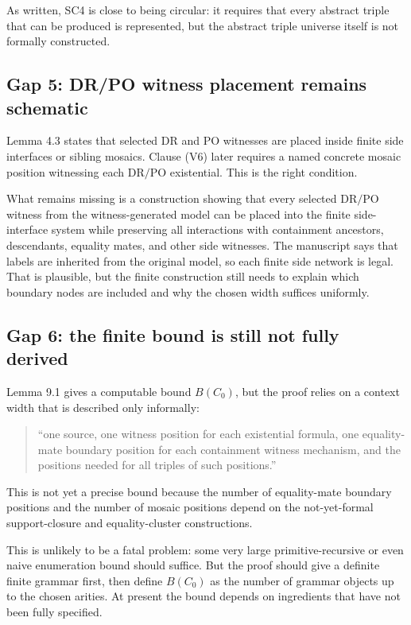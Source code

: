 \documentclass[11pt]{article}
\newcommand{\DR}{\mathrm{DR}}
\newcommand{\PO}{\mathrm{PO}}
\begin{document}
As written, SC4 is close to being circular: it requires that every abstract triple that can be produced is represented, but the abstract triple universe itself is not formally constructed.

\subsection{Gap 5: DR/PO witness placement remains schematic}

Lemma 4.3 states that selected \(\DR\) and \(\PO\) witnesses are placed inside finite side interfaces or sibling mosaics.  Clause (V6) later requires a named concrete mosaic position witnessing each \(\DR/\PO\) existential.  This is the right condition.

What remains missing is a construction showing that every selected \(\DR/\PO\) witness from the witness-generated model can be placed into the finite side-interface system while preserving all interactions with containment ancestors, descendants, equality mates, and other side witnesses.  The manuscript says that labels are inherited from the original model, so each finite side network is legal.  That is plausible, but the finite construction still needs to explain which boundary nodes are included and why the chosen width suffices uniformly.

\subsection{Gap 6: the finite bound is still not fully derived}

Lemma 9.1 gives a computable bound \(B(C_0)\), but the proof relies on a context width that is described only informally:
\begin{quote}
``one source, one witness position for each existential formula, one equality-mate boundary position for each containment witness mechanism, and the positions needed for all triples of such positions.''
\end{quote}
This is not yet a precise bound because the number of equality-mate boundary positions and the number of mosaic positions depend on the not-yet-formal support-closure and equality-cluster constructions.

This is unlikely to be a fatal problem: some very large primitive-recursive or even naive enumeration bound should suffice.  But the proof should give a definite finite grammar first, then define \(B(C_0)\) as the number of grammar objects up to the chosen arities.  At present the bound depends on ingredients that have not been fully specified.
\end{document}

